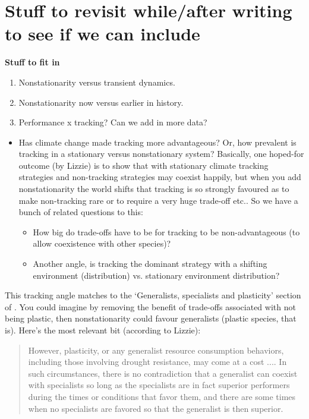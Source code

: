 \documentclass[11pt,letterpaper]{article}
\begin{document}
\section{Stuff to revisit while/after writing to see if we can include}

{\bf Stuff to fit in}
\begin{enumerate}
\item Nonstationarity versus transient dynamics. 
\item Nonstationarity now versus earlier in history. 
\item Performance x tracking? Can we add in more data?
\end{enumerate}

\begin{itemize}
\item Has climate change made tracking more advantageous? Or, how prevalent is tracking in a stationary versus nonstationary system? Basically, one hoped-for outcome (by Lizzie) is to show that with stationary climate tracking strategies and non-tracking strategies may coexist happily, but when you add nonstationarity the world shifts that tracking is so strongly favoured as to make non-tracking rare or to require a very huge trade-off etc.. So we have a bunch of related questions to this:
\begin{itemize}
\item How big do trade-offs have to be for tracking to be non-advantageous (to allow coexistence with other species)?
\item Another angle, is tracking the dominant strategy with a shifting environment (distribution) vs. stationary environment distribution?
\end{itemize}
\end{itemize}

\noindent This tracking angle matches to the `Generalists, specialists and plasticity' section of \citet{Chesson:2004eo}. You could imagine by removing the benefit of trade-offs associated with not being plastic, then nonstationarity could favour generalists (plastic species, that is). Here's the most relevant bit (according to Lizzie):
\begin{quote}
However, plasticity, or any generalist resource consumption
behaviors, including those involving drought resistance,
may come at a cost .... In such circumstances, there is no
contradiction that a generalist can coexist with specialists
so long as the specialists are in fact superior performers
during the times or conditions that favor them, and there 
are some times when no specialists are favored so that the
generalist is then superior.
\end{quote}
\end{document}
